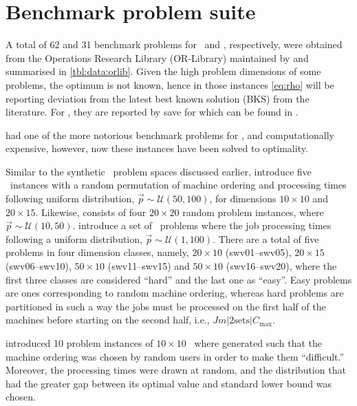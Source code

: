 \section{Benchmark problem suite}\label{sec:data:orlib}
A total of 62 and 31 benchmark problems for \JSP\ and \FSP, respectively, were obtained from the Operations Research Library (OR-Library) maintained by \citet{ORlibrary} and summarised in \cref{tbl:data:orlib}. 
Given the high problem dimensions of some problems, the optimum is not known, hence in those instances \cref{eq:rho} will be reporting  deviation from the latest best known solution (BKS) from the literature. For \JSP, they are reported by \citet{jsspBESTsofar} save for  which can be found in %
.

\citet{orlib_ft} had one of the more notorious benchmark problems for \JSP, and computationally expensive, however, now these instances have been solved to optimality. 


Similar to the synthetic \JSP\ problem spaces discussed earlier, \citet{orlib_abz} introduce five \JSP\ instances with a random permutation of machine ordering and processing times following uniform distribution,  $\vec{p}\sim\mathcal{U}(50,100)$, for  dimensions $10\times10$ and $20\times15$. Likewise, \citet{orlib_yn} consists of four $20\times20$ random problem instances, where $\vec{p}\sim\mathcal{U}(10,50)$.
\citet{orlib_swv} introduce a set of \JSP\ problems where the job processing times following a uniform distribution, $\vec{p}\sim\mathcal{U}(1,100)$. There are a total of  five problems in four dimension classes, namely, $20\times10$ (swv01--swv05), $20\times15$ (swv06--swv10), $50\times10$ (swv11--swv15) and $50\times10$ (swv16--swv20), where the first three classes are considered ``{hard}'' and the last one as ``{easy}''. Easy problems are ones corresponding to random machine ordering, whereas hard problems are partitioned in such a way the jobs must be processed on the first half of the machines before starting on the second half, i.e., $Jm|\text{2sets}|C_{\max}$.

\citet{orlib_orb} introduced 10 problem instances of $10\times10$ \JSP\ where generated such that the machine ordering was chosen by random users in order to make them ``difficult.'' Moreover, the processing times were drawn at random, and the distribution that had the greater gap between its optimal value and standard lower bound was chosen. 

